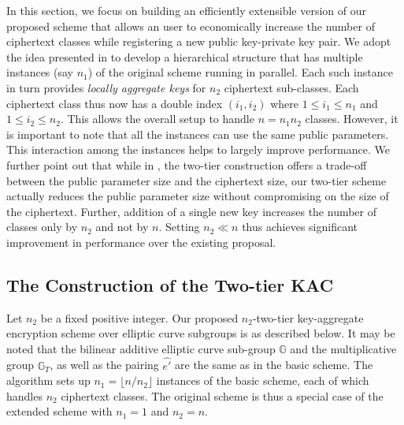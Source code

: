 In this section, we focus on building an efficiently extensible version of our proposed scheme that allows an user to economically increase the number of ciphertext classes while registering a new public key-private key pair. We adopt the idea presented in \cite{boneh2005collusion} to develop a hierarchical structure that has multiple instances (say $n_1$) of the original scheme running in parallel. Each such instance in turn provides \emph{locally aggregate keys} for $n_2$ ciphertext sub-classes. Each ciphertext class thus now has a double index $(i_1,i_2)$ where $1\leq i_1 \leq n_1$ and $1\leq i_2 \leq n_2$. This allows the overall setup to handle $n=n_1n_2$ classes. However, it is important to note that all the instances can use the same public parameters. This interaction among the instances helps to largely improve performance. We further point out that while in \cite{boneh2005collusion}, the two-tier construction offers a trade-off between the public parameter size and the ciphertext size, our 
two-tier scheme actually reduces the public parameter size without compromising on the size of the ciphertext. Further, addition of a single new key increases the number of classes only by $n_2$ and not by $n$. Setting $n_2\ll n$ thus achieves significant improvement in performance over the existing proposal.


\subsection{The Construction of the Two-tier KAC}
\label{subsec:construction2}

Let $n_2$ be a fixed positive integer. Our proposed $n_2$-two-tier key-aggregate encryption scheme over elliptic curve subgroups is as described below. It may be noted that the bilinear additive elliptic curve sub-group $\mathbb{G}$ and the multiplicative group $\mathbb{G}_T$, as well as the pairing $\hat{e'}$ are the same as in the basic scheme. The algorithm sets up $n_1=\lfloor n/n_2\rfloor$ instances of the basic scheme, each of which handles $n_2$ ciphertext classes. The original scheme is thus a special case of the extended scheme with $n_1=1$ and $n_2=n$.


